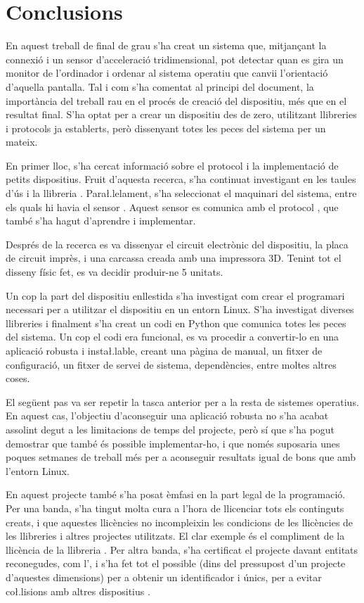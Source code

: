 \chapter{Conclusions}

En aquest treball de final de grau s'ha creat un sistema que, mitjançant la
connexió  i un sensor d'acceleració tridimensional, pot detectar quan
es gira un monitor de l'ordinador i ordenar al sistema operatiu que canvii
l'orientació d'aquella pantalla. Tal i com s'ha comentat al principi del
document, la importància del treball rau en el procés de creació del dispositiu,
més que en el resultat final. S'ha optat per a crear un dispositiu des de zero,
utilitzant llibreries i protocols ja establerts, però dissenyant totes les peces
del sistema per un mateix.

En primer lloc, s'ha cercat informació sobre el protocol  i la
implementació de petits dispositius. Fruit d'aquesta recerca, s'ha continuat
investigant en les taules d'ús  i la llibreria .
Para\l.lelament, s'ha seleccionat el maquinari del sistema, entre els quals hi
havia el sensor . Aquest sensor es comunica amb el protocol
, que també s'ha hagut d'aprendre i implementar.

Després de la recerca es va dissenyar el circuit electrònic del dispositiu,
la placa de circuit imprès, i una carcassa creada amb una impressora 3D.
Tenint tot el disseny físic fet, es va decidir produir-ne 5 unitats.

Un cop la part del dispositiu enllestida s'ha investigat com crear el
programari necessari per a utilitzar el dispositiu en un entorn Linux. S'ha
investigat diverses llibreries i finalment s'ha creat un codi en Python que
comunica totes les peces del sistema. Un cop el codi era funcional, es va
procedir a convertir-lo en una aplicació robusta i insta\l.lable, creant una
pàgina de manual, un fitxer de configuració, un fitxer de servei de sistema,
dependències, entre moltes altres coses.

El següent pas va ser repetir la tasca anterior per a la resta de sistemes
operatius. En aquest cas, l'objectiu d'aconseguir una aplicació robusta no s'ha
acabat assolint degut a les limitacions de temps del projecte, però sí que s'ha
pogut demostrar que també és possible implementar-ho, i que només suposaria
unes poques setmanes de treball més per a aconseguir resultats igual de bons
que amb l'entorn Linux.

En aquest projecte també s'ha posat èmfasi en la part legal de la programació.
Per una banda, s'ha tingut molta cura a l'hora de llicenciar tots els continguts
creats, i que aquestes llicències no incompleixin les condicions de les
llicències de les llibreries i altres projectes utilitzats. El clar exemple és
el compliment de la llicència de la llibreria . Per altra banda,
s'ha certificat el projecte davant entitats reconegudes, com l', i
s'ha fet tot el possible (dins del pressupost d'un projecte d'aquestes
dimensions) per a obtenir un identificador  i  únics, per a
evitar co\l.lisions amb altres dispositius .

